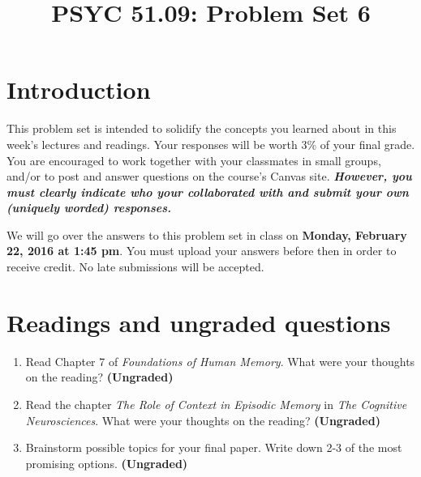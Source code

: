 \documentclass[11pt]{article}
\title{PSYC 51.09: Problem Set 6}
\date{}
\begin{document}
\maketitle
\vspace{-0.75in}
\section*{Introduction}
This problem set is intended to solidify the concepts you learned about in this week's lectures and readings.  Your responses will be worth 3\% of your final grade.  You are encouraged to work together with your classmates in small groups, and/or to post and answer questions on the course’s Canvas site.  \textbf{\textit{However, you must clearly indicate who your collaborated with and submit your own (uniquely worded) responses.}}

We will go over the answers to this problem set in class on \textbf{Monday, February 22, 2016 at 1:45 pm}.  You must upload your answers before then in order to receive credit.  No late submissions will be accepted.

\section*{Readings and ungraded questions}
\begin{enumerate}
\item Read Chapter 7 of \textit{Foundations of Human Memory}.  What were your thoughts on the reading?
  \textbf{(Ungraded)}

\item Read the chapter \textit{The Role of Context in Episodic Memory}
  in \textit{The Cognitive Neurosciences}.  What were your thoughts on the reading?
  \textbf{(Ungraded)}

\item Brainstorm possible topics for your final paper.  Write down 2-3
  of the most promising options.  \textbf{(Ungraded)}
\end{enumerate}
\end{document}
